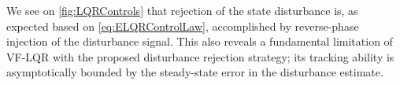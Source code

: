 We see on \cref{fig:LQRControls} that rejection of the state disturbance is, as expected based on \cref{eq:ELQRControlLaw}, accomplished by reverse-phase injection of the disturbance signal. This also reveals a fundamental limitation of VF-LQR with the proposed disturbance rejection strategy; its tracking ability is asymptotically bounded by the steady-state error in the disturbance estimate.


